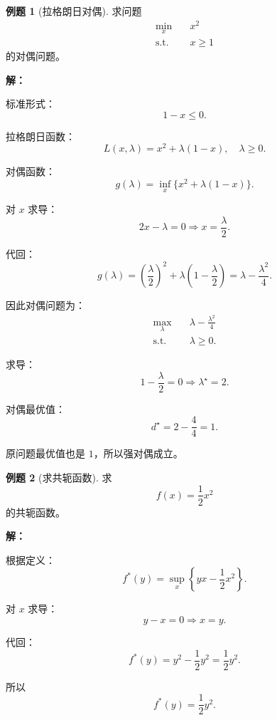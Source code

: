 \documentclass[11pt,a4paper]{ctexart}
\newcommand{\st}{\text{s.t.}}
\theoremstyle{definition}
\newtheorem{example}{例题}[section]
\theoremstyle{plain}
\theoremstyle{remark}
\begin{document}
\begin{example}[拉格朗日对偶]
求问题
\[
\begin{aligned}
    \min_x\quad & x^2\\
    \st\quad & x\ge1
\end{aligned}
\]
的对偶问题。

\textbf{解：}

标准形式：
\[
    1-x\le0.
\]

拉格朗日函数：
\[
    L(x,\lambda)=x^2+\lambda(1-x),
    \quad \lambda\ge0.
\]

对偶函数：
\[
    g(\lambda)=\inf_x \{x^2+\lambda(1-x)\}.
\]

对 $x$ 求导：
\[
    2x-\lambda=0
    \Rightarrow
    x=\frac{\lambda}{2}.
\]

代回：
\[
    g(\lambda)
    =
    \left(\frac{\lambda}{2}\right)^2
    +
    \lambda
    \left(1-\frac{\lambda}{2}\right)
    =
    \lambda-\frac{\lambda^2}{4}.
\]

因此对偶问题为：
\[
\begin{aligned}
    \max_\lambda\quad & \lambda-\frac{\lambda^2}{4}\\
    \st\quad & \lambda\ge0.
\end{aligned}
\]

求导：
\[
    1-\frac{\lambda}{2}=0
    \Rightarrow
    \lambda^\star=2.
\]

对偶最优值：
\[
    d^\star=2-\frac{4}{4}=1.
\]

原问题最优值也是 $1$，所以强对偶成立。
\end{example}

\begin{example}[求共轭函数]
求
\[
    f(x)=\frac12 x^2
\]
的共轭函数。

\textbf{解：}

根据定义：
\[
    f^\ast(y)=\sup_x \left\{yx-\frac12x^2\right\}.
\]

对 $x$ 求导：
\[
    y-x=0
    \Rightarrow
    x=y.
\]

代回：
\[
    f^\ast(y)=y^2-\frac12 y^2=\frac12 y^2.
\]

所以
\[
    f^\ast(y)=\frac12 y^2.
\]
\end{example}
\end{document}
